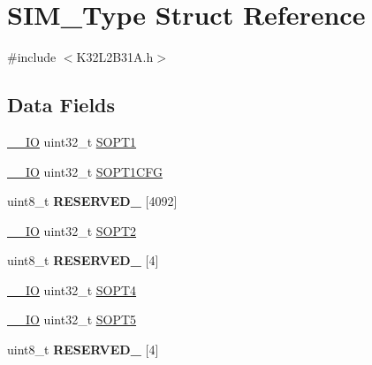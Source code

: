 \hypertarget{struct_s_i_m___type}{}\section{S\+I\+M\+\_\+\+Type Struct Reference}
\label{struct_s_i_m___type}


{\ttfamily \#include $<$K32\+L2\+B31\+A.\+h$>$}

\subsection*{Data Fields}
\begin{DoxyCompactItemize}
\item 
\mbox{\hyperlink{core__cm0plus_8h_aec43007d9998a0a0e01faede4133d6be}{\+\_\+\+\_\+\+IO}} uint32\+\_\+t \mbox{\hyperlink{struct_s_i_m___type_a2dd2ae7d066d4b4240fe56f72f0f7095}{S\+O\+P\+T1}}
\item 
\mbox{\hyperlink{core__cm0plus_8h_aec43007d9998a0a0e01faede4133d6be}{\+\_\+\+\_\+\+IO}} uint32\+\_\+t \mbox{\hyperlink{struct_s_i_m___type_ae691410c960f357d63ab3b479cb59641}{S\+O\+P\+T1\+C\+FG}}
\item 
\mbox{\label{struct_s_i_m___type_ae7904b8fe3af1def40d58c2ca8123e44}} 
uint8\+\_\+t {\bfseries R\+E\+S\+E\+R\+V\+E\+D\+\_} \mbox{[}4092\mbox{]}
\item 
\mbox{\hyperlink{core__cm0plus_8h_aec43007d9998a0a0e01faede4133d6be}{\+\_\+\+\_\+\+IO}} uint32\+\_\+t \mbox{\hyperlink{struct_s_i_m___type_a3f8dc2ae265d799ec159ccd2c2fddabd}{S\+O\+P\+T2}}
\item 
\mbox{\label{struct_s_i_m___type_a422ac2beba1cc5c797380d1c5832b885}} 
uint8\+\_\+t {\bfseries R\+E\+S\+E\+R\+V\+E\+D\+\_} \mbox{[}4\mbox{]}
\item 
\mbox{\hyperlink{core__cm0plus_8h_aec43007d9998a0a0e01faede4133d6be}{\+\_\+\+\_\+\+IO}} uint32\+\_\+t \mbox{\hyperlink{struct_s_i_m___type_a5e152370dc7f083dff49c4e56e669435}{S\+O\+P\+T4}}
\item 
\mbox{\hyperlink{core__cm0plus_8h_aec43007d9998a0a0e01faede4133d6be}{\+\_\+\+\_\+\+IO}} uint32\+\_\+t \mbox{\hyperlink{struct_s_i_m___type_ad3423d05c1b61a09639d9ea8b5d3ea66}{S\+O\+P\+T5}}
\item 
\mbox{\label{struct_s_i_m___type_acc19a07675d1806592b3ed4a92f91e1c}} 
uint8\+\_\+t {\bfseries R\+E\+S\+E\+R\+V\+E\+D\+\_} \mbox{[}4\mbox{]}

\end{DoxyCompactItemize}
